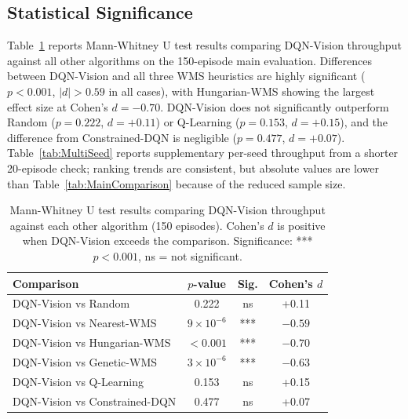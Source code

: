 \documentclass[conference]{IEEEtran}
\begin{document}
\subsection{Statistical Significance}

Table~\ref{tab:StatTests} reports Mann-Whitney U test results comparing DQN-Vision throughput against all other algorithms on the 150-episode main evaluation.
Differences between DQN-Vision and all three WMS heuristics are highly significant ($p < 0.001$, $|d| > 0.59$ in all cases), with Hungarian-WMS showing the largest effect size at Cohen's $d = -0.70$.
DQN-Vision does not significantly outperform Random ($p = 0.222$, $d = +0.11$) or Q-Learning ($p = 0.153$, $d = +0.15$), and the difference from Constrained-DQN is negligible ($p = 0.477$, $d = +0.07$).
Table~\ref{tab:MultiSeed} reports supplementary per-seed throughput from a shorter 20-episode check; ranking trends are consistent, but absolute values are lower than Table~\ref{tab:MainComparison} because of the reduced sample size.

\begin{table}[!ht]
\centering
\caption{Mann-Whitney U test results comparing DQN-Vision throughput against each other algorithm (150 episodes). Cohen's $d$ is positive when DQN-Vision exceeds the comparison. Significance: *** $p<0.001$, ns = not significant.}
\label{tab:StatTests}
\renewcommand{\arraystretch}{1.1}
\begin{tabular}{|l|c|c|c|}
\hline
\textbf{Comparison} & \textbf{$p$-value} & \textbf{Sig.} & \textbf{Cohen's $d$} \\
\hline
DQN-Vision vs Random         & 0.222    & ns  & +0.11 \\
DQN-Vision vs Nearest-WMS    & $9\times10^{-6}$ & *** & $-0.59$ \\
DQN-Vision vs Hungarian-WMS  & $<0.001$ & *** & $-0.70$ \\
DQN-Vision vs Genetic-WMS    & $3\times10^{-6}$ & *** & $-0.63$ \\
DQN-Vision vs Q-Learning     & 0.153    & ns  & +0.15 \\
DQN-Vision vs Constrained-DQN & 0.477   & ns  & +0.07 \\
\hline
\end{tabular}
\end{table}
\end{document}
